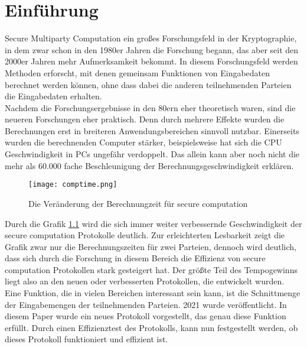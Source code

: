 \chapter{Einführung}
Secure Multiparty Computation ein großes Forschungsfeld in der Kryptographie, in dem zwar schon in den 1980er Jahren die Forschung begann, das aber seit den 2000er Jahren mehr Aufmerksamkeit bekommt. \cite{Kogan2021}
In diesem Forschungsfeld werden Methoden erforscht, mit denen gemeinsam Funktionen von Eingabedaten berechnet werden können, ohne dass dabei die anderen teilnehmenden Parteien die Eingabedaten erhalten.\\
Nachdem die Forschungsergebnisse in den 80ern eher theoretisch waren, sind die neueren Forschungen eher praktisch. Denn durch mehrere Effekte wurden die Berechnungen erst in breiteren Anwendungsbereichen sinnvoll nutzbar. Einerseits wurden die berechnenden Computer stärker, beispielsweise hat sich die CPU Geschwindigkeit in PCs ungefähr verdoppelt. Das allein kann aber noch nicht die mehr als 60.000 fache Beschleunigung der Berechnungsgeschwindigkeit erklären. \cite{Kogan2021}
\begin{figure}[h]
\begin{center}
\texttt{[image: comptime.png]}
\caption{Die Veränderung der Berechnungzeit für secure computation}
\cite{Kogan2021}
\label{evolution_of_computation}

\end{center}

\end{figure}


Durch die Grafik \ref{evolution_of_computation} wird die sich immer weiter verbessernde Geschwindigkeit der secure computation Protokolle deutlich. Zur erleichterten Lesbarkeit zeigt die Grafik zwar nur die Berechnungszeiten für zwei Parteien, dennoch wird deutlich, dass sich durch die Forschung in diesem Bereich die Effizienz von secure computation Protokollen stark gesteigert hat.
Der größte Teil des Tempogewinns liegt also an den neuen oder verbesserten Protokollen, die entwickelt wurden.\\
Eine Funktion, die in vielen Bereichen interessant sein kann, ist die Schnittmenge der Eingabemengen der teilnehmenden Parteien. 2021 wurde \cite{Doettling2021} veröffentlicht. In diesem Paper wurde ein neues Protokoll vorgestellt, das genau diese Funktion erfüllt. Durch einen Effizienztest des Protokolls, kann nun festgestellt werden, ob dieses Protokoll funktioniert und effizient ist.

